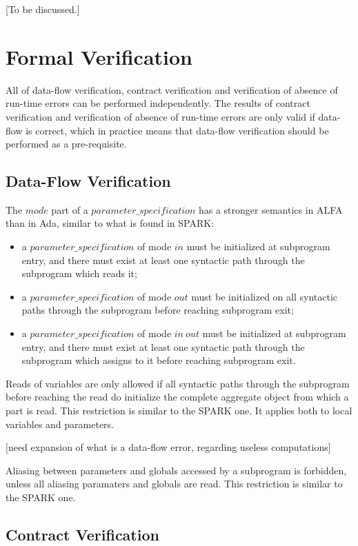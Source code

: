 \documentclass{article}
\newcommand{\bnf}[1]{$\mathit{#1}$}
\begin{document}
[To be discussed.]

\section{Formal Verification}

All of data-flow verification, contract verification and verification of
absence of run-time errors can be performed independently. The results of
contract verification and verification of absence of run-time errors are only
valid if data-flow is correct, which in practice means that data-flow
verification should be performed as a pre-requisite.

\subsection{Data-Flow Verification}

The \bnf{mode} part of a \bnf{parameter\_specification} has a stronger
semantics in ALFA than in Ada, similar to what is found in SPARK:
\begin{itemize}
\item a \bnf{parameter\_specification} of mode \bnf{in} must be initialized at
  subprogram entry, and there must exist at least one syntactic path through
  the subprogram which reads it;
\item a \bnf{parameter\_specification} of mode \bnf{out} must be initialized on
  all syntactic paths through the subprogram before reaching subprogram exit;
\item a \bnf{parameter\_specification} of mode \bnf{in\ out} must be initialized
  at subprogram entry, and there must exist at least one syntactic path through
  the subprogram which assigns to it before reaching subprogram exit.
\end{itemize}

Reads of variables are only allowed if all syntactic paths through the
subprogram before reaching the read do initialize the complete aggregate object
from which a part is read. This restriction is similar to the SPARK one. It
applies both to local variables and parameters.

[need expansion of what is a data-flow error, regarding useless computations]

Aliasing between parameters and globals accessed by a subprogram is forbidden,
unless all aliasing paramaters and globals are read. This restriction is
similar to the SPARK one.

\subsection{Contract Verification}
\end{document}
